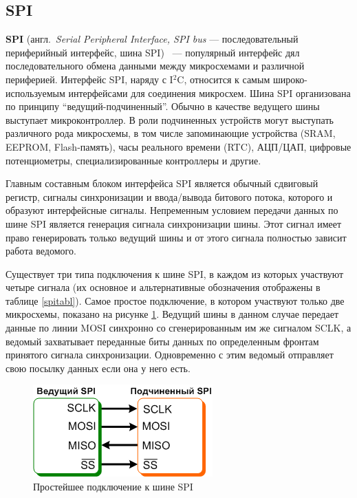 \fi

\newpage

\subsection{SPI}

\textbf{SPI} (англ.~\textit{Serial Peripheral Interface, SPI bus} --- последовательный периферийный интерфейс, шина SPI) ~--- популярный интерфейс дял последовательного обмена данными между микросхемами и различной периферией\cite{spiinterface}. Интерфейс SPI, наряду с I$^2$C, относится к самым широко-используемым интерфейсами для соединения микросхем. Шина SPI организована по принципу ``ведущий-подчиненный''. Обычно в качестве ведущего шины выступает микроконтроллер. В роли подчиненных устройств могут выступать различного рода микросхемы, в том числе запоминающие устройства (SRAM, EEPROM, Flash-память), часы реального времени (RTC), АЦП/ЦАП, цифровые потенциометры, специализированные контроллеры и другие.

Главным составным блоком интерфейса SPI является обычный сдвиговый регистр, сигналы синхронизации и ввода/вывода битового потока, которого и образуют интерфейсные сигналы. Непременным условием передачи данных по шине SPI является генерация сигнала синхронизации шины. Этот сигнал имеет право генерировать только ведущий шины и от этого сигнала полностью зависит работа ведомого.

Существует три типа подключения к шине SPI, в каждом из которых участвуют четыре сигнала (их основное и альтернативные обозначения отображены в таблице \ref{spitabl}). Самое простое подключение, в котором участвуют только две микросхемы, показано на рисунке \ref{fig:spiconnection}. Ведущий шины в данном случае передает данные по линии MOSI синхронно со сгенерированным им же сигналом SCLK, а ведомый захватывает переданные биты данных по определенным фронтам принятого сигнала синхронизации. Одновременно с этим ведомый отправляет свою посылку данных если она у него есть. 

\begin{figure}[H]
	\centering
		\includegraphics[scale=1.0]{img/spiconnect.png}
	\caption{Простейшее подключение к шине SPI \label{fig:spiconnection}}
\end{figure}

